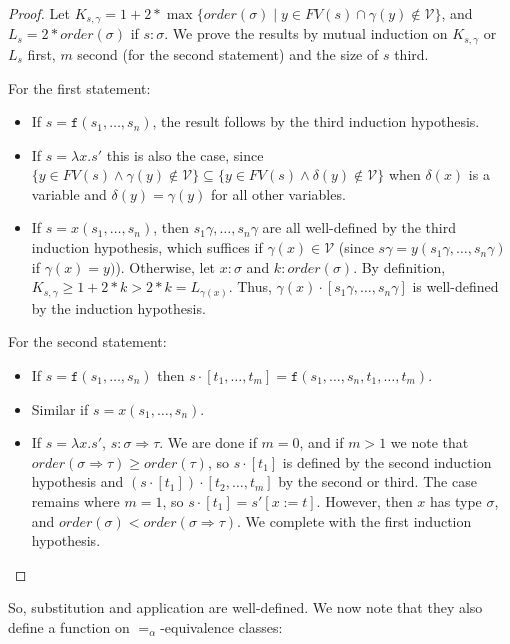 \documentclass{lmcs}
\theoremstyle{theorem}\newtheorem{theorem}{Theorem}
\theoremstyle{theorem}\newtheorem{lemma}[theorem]{Lemma}
\theoremstyle{theorem}\newtheorem{corollary}[theorem]{Corollary}
\theoremstyle{definition}\newtheorem{definition}[theorem]{Definition}
\theoremstyle{definition}\newtheorem{example}[theorem]{Example}
\newcommand{\V}{\mathcal{V}}
\newcommand{\FV}{\mathit{FV}}
\newcommand{\order}{\mathit{order}}
\newcommand{\atype}{\sigma}
\newcommand{\btype}{\tau}
\newcommand{\identifier}[1]{\mathtt{#1}}
\newcommand{\afun}{\identifier{f}}
\newcommand{\avar}{x}
\newcommand{\bvar}{y}
\newcommand{\abs}[2]{\lambda #1.#2}
\newcommand{\arrtype}{\Rightarrow}
\begin{document}
\begin{proof}
Let $K_{s,\gamma} = 1 + 2 * \max\{ \order(\atype) \mid \bvar \in \FV(s) \cap \gamma(\bvar) \notin
\V \}$, and $L_s = 2 * \order(\atype)$ if $s : \atype$.  We prove the results by mutual induction
on $K_{s,\gamma}$ or $L_s$ first, $m$ second (for the second statement) and the size of $s$ third.

For the first statement:
\begin{itemize}
\item If $s = \afun(s_1,\dots,s_n)$, the result follows by the third induction hypothesis.
\item If $s = \abs{\avar}{s'}$ this is also the case, since $\{ \bvar \in \FV(s) \wedge
  \gamma(\bvar) \notin \V \} \subseteq \{ \bvar \in \FV(s) \wedge \delta(\bvar) \notin \V
  \}$ when $\delta(\avar)$ is a variable and $\delta(\bvar) = \gamma(\bvar)$ for all other
  variables.
\item If $s = \avar(s_1,\dots,s_n)$, then $s_1\gamma,\dots,s_n\gamma$ are all well-defined by
  the third induction hypothesis, which suffices if $\gamma(\avar) \in \V$ (since
  $s\gamma = \bvar(s_1\gamma,\dots,s_n\gamma)$ if $\gamma(\avar) = \bvar)$).
  Otherwise, let $\avar : \atype$ and $k : \order(\atype)$.  By definition, $K_{s,\gamma} \geq 1 +
  2 * k > 2 * k = L_{\gamma(\avar)}$.  Thus, $\gamma(\avar) \cdot [s_1\gamma,\dots,s_n\gamma]$
  is well-defined by the induction hypothesis.
\end{itemize}
For the second statement:
\begin{itemize}
\item If $s = \afun(s_1,\dots,s_n)$ then $s \cdot [t_1,\dots,t_m] = \afun(s_1,\dots,s_n,t_1,\dots,
  t_m)$.
\item Similar if $s = \avar(s_1,\dots,s_n)$.
\item If $s = \abs{\avar}{s'}$, $s : \atype \arrtype \btype$. We are done if $m = 0$, and if
  $m > 1$ we note that $\order(\atype \arrtype \btype) \geq \order(\btype)$, so $s \cdot [t_1]$ is
  defined by the second induction hypothesis and $(s \cdot [t_1]) \cdot [t_2,\dots,t_m]$ by the
  second or third.  The case remains where $m = 1$, so $s \cdot [t_1] = s'[\avar:=t]$.  However,
  then $\avar$ has type $\atype$, and $\order(\atype) < \order(\atype \arrtype \btype)$.  We
  complete with the first induction hypothesis.
  \qedhere
\end{itemize}
\end{proof}

So, substitution and application are well-defined.  We now note that they also define a function on
$=_\alpha$-equivalence classes:
\end{document}
